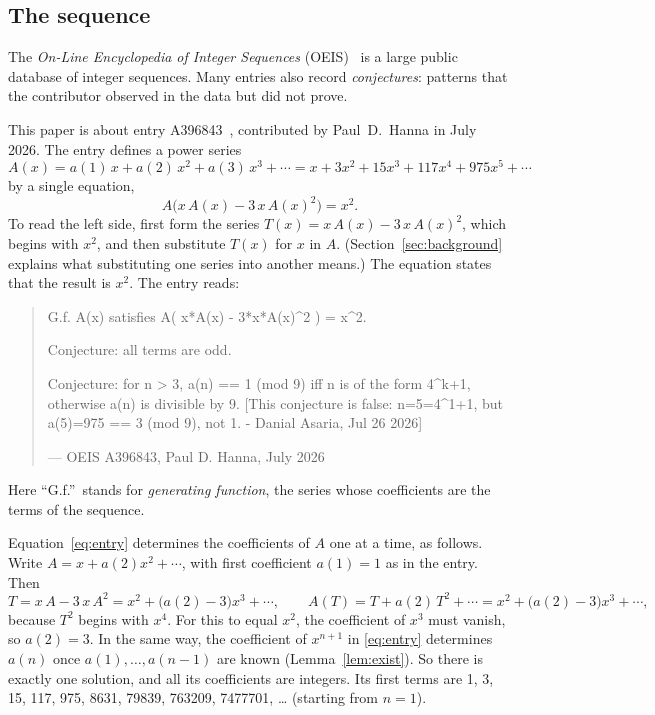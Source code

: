 \documentclass[11pt,a4paper]{article}
\theoremstyle{definition}
\theoremstyle{remark}
\begin{document}
\subsection{The sequence}\label{sec:sequence}
The \emph{On-Line Encyclopedia of Integer Sequences} (OEIS)~\cite{oeisdb} is a large public database of integer
sequences. Many
entries also record \emph{conjectures}: patterns that the contributor observed in the data but did not prove.

This paper is about entry A396843~\cite{oeis3}, contributed by Paul~D.~Hanna in July 2026.
The entry defines a power series
\[
A(x)=a(1)\,x+a(2)\,x^2+a(3)\,x^3+\cdots=x+3x^2+15x^3+117x^4+975x^5+\cdots
\]
by a single equation,
\begin{equation}\label{eq:entry}
A\bigl(x\,A(x)-3\,x\,A(x)^2\bigr)=x^2 .
\end{equation}
To read the left side, first form the series $T(x)=x\,A(x)-3\,x\,A(x)^2$, which begins with $x^2$, and
then substitute $T(x)$ for $x$ in $A$. (Section~\ref{sec:background} explains what substituting one series into another
means.) The equation states that the result is $x^2$. The entry reads:
\begin{quote}\small\ttfamily\raggedright G.f. A(x) satisfies A( x*A(x) - 3*x*A(x)\^{}2 ) = x\^{}2.\par\smallskip Conjecture: all terms are odd.\par\smallskip Conjecture: for n > 3, a(n) == 1 (mod 9) iff n is of the form 4\^{}k+1, otherwise a(n) is divisible by 9. [This conjecture is false: n=5=4\^{}1+1, but a(5)=975 == 3 (mod 9), not 1. - Danial Asaria, Jul 26 2026]\par\smallskip\hfill\textrm{--- OEIS A396843, Paul D. Hanna, July 2026}\end{quote}

Here ``G.f.''\ stands for \emph{generating function}, the series whose coefficients are the terms of the sequence.

Equation~\eqref{eq:entry} determines the coefficients of $A$ one at a time, as follows. Write $A=x+a(2)x^2+\cdots$, with first coefficient $a(1)=1$ as in the entry. Then
\[
T=x\,A-3\,x\,A^2=x^2+\bigl(a(2)-3\bigr)x^3+\cdots,
\qquad
A(T)=T+a(2)\,T^2+\cdots=x^2+\bigl(a(2)-3\bigr)x^3+\cdots,
\]
because $T^2$ begins with $x^4$. For this to equal $x^2$, the coefficient of $x^3$ must vanish, so
$a(2)=3$. In the same way, the coefficient of $x^{n+1}$ in \eqref{eq:entry} determines $a(n)$ once
$a(1),\dots,a(n-1)$ are known (Lemma~\ref{lem:exist}). So there is exactly one solution, and all its coefficients are
integers. Its first terms are 1, 3, 15, 117, 975, 8631, 79839, 763209, 7477701, \dots{} (starting from $n=1$).
\end{document}
